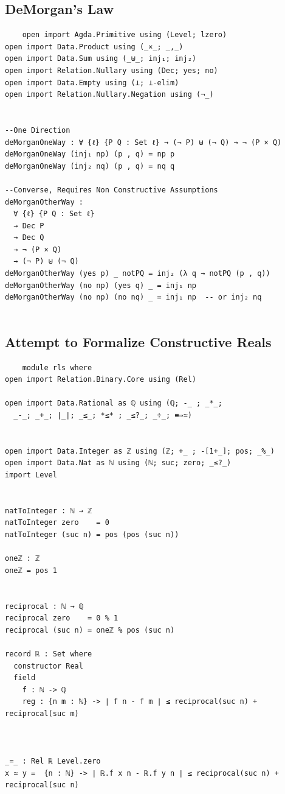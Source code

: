 \documentclass[12pt]{article}
\begin{document}
\subsection{DeMorgan's Law}
\begin{verbatim}
    open import Agda.Primitive using (Level; lzero)
open import Data.Product using (_×_; _,_)
open import Data.Sum using (_⊎_; inj₁; inj₂)
open import Relation.Nullary using (Dec; yes; no)
open import Data.Empty using (⊥; ⊥-elim)
open import Relation.Nullary.Negation using (¬_)


--One Direction
deMorganOneWay : ∀ {ℓ} {P Q : Set ℓ} → (¬ P) ⊎ (¬ Q) → ¬ (P × Q)
deMorganOneWay (inj₁ np) (p , q) = np p
deMorganOneWay (inj₂ nq) (p , q) = nq q

--Converse, Requires Non Constructive Assumptions
deMorganOtherWay :
  ∀ {ℓ} {P Q : Set ℓ}
  → Dec P
  → Dec Q
  → ¬ (P × Q)
  → (¬ P) ⊎ (¬ Q)
deMorganOtherWay (yes p) _ notPQ = inj₂ (λ q → notPQ (p , q))
deMorganOtherWay (no np) (yes q) _ = inj₁ np
deMorganOtherWay (no np) (no nq) _ = inj₁ np  -- or inj₂ nq


\end{verbatim}

\subsection{Attempt to Formalize Constructive Reals}
\begin{verbatim}
    module rls where
open import Relation.Binary.Core using (Rel)

open import Data.Rational as ℚ using (ℚ; -_ ; _*_; 
  _-_; _+_; ∣_∣; _≤_; *≤* ; _≤?_; _÷_; ≡⇒≃)


open import Data.Integer as ℤ using (ℤ; +_ ; -[1+_]; pos; _%_)
open import Data.Nat as ℕ using (ℕ; suc; zero; _≤?_)
import Level


natToInteger : ℕ → ℤ
natToInteger zero    = 0
natToInteger (suc n) = pos (pos (suc n))

oneℤ : ℤ
oneℤ = pos 1


reciprocal : ℕ → ℚ
reciprocal zero    = 0 % 1
reciprocal (suc n) = oneℤ % pos (suc n)

record ℝ : Set where
  constructor Real
  field
    f : ℕ -> ℚ
    reg : {n m : ℕ} -> ∣ f n - f m ∣ ≤ reciprocal(suc n) + reciprocal(suc m)



_≃_ : Rel ℝ Level.zero
x ≃ y =  {n : ℕ} -> ∣ ℝ.f x n - ℝ.f y n ∣ ≤ reciprocal(suc n) + reciprocal(suc n)


\end{verbatim}
\end{document}
